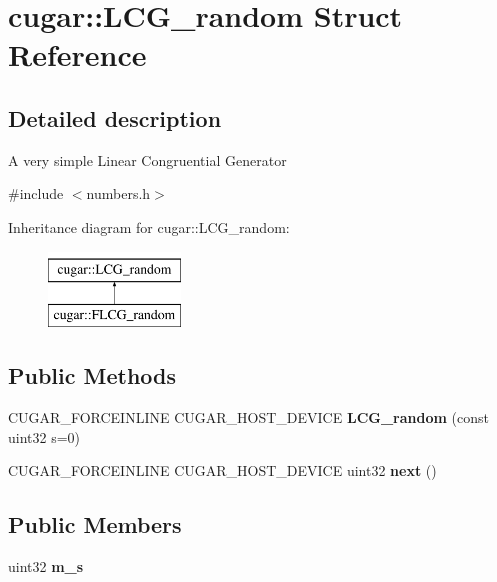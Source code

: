 \hypertarget{structcugar_1_1_l_c_g__random}{}\section{cugar\+:\+:L\+C\+G\+\_\+random Struct Reference}
\label{structcugar_1_1_l_c_g__random}


\subsection{Detailed description}
A very simple Linear Congruential Generator 

{\ttfamily \#include $<$numbers.\+h$>$}

Inheritance diagram for cugar\+:\+:L\+C\+G\+\_\+random\+:\begin{figure}[H]
\begin{center}
\leavevmode
\includegraphics[height=2.000000cm]{structcugar_1_1_l_c_g__random}
\end{center}
\end{figure}
\subsection*{Public Methods}
\begin{DoxyCompactItemize}
\item 
\mbox{\label{structcugar_1_1_l_c_g__random_a9e8beadc386fbf731a1124690563842d}} 
C\+U\+G\+A\+R\+\_\+\+F\+O\+R\+C\+E\+I\+N\+L\+I\+NE C\+U\+G\+A\+R\+\_\+\+H\+O\+S\+T\+\_\+\+D\+E\+V\+I\+CE {\bfseries L\+C\+G\+\_\+random} (const uint32 s=0)
\item 
\mbox{\label{structcugar_1_1_l_c_g__random_a50a0c4356d6e21e38e0374627944612e}} 
C\+U\+G\+A\+R\+\_\+\+F\+O\+R\+C\+E\+I\+N\+L\+I\+NE C\+U\+G\+A\+R\+\_\+\+H\+O\+S\+T\+\_\+\+D\+E\+V\+I\+CE uint32 {\bfseries next} ()
\end{DoxyCompactItemize}
\subsection*{Public Members}
\begin{DoxyCompactItemize}
\item 
\mbox{\label{structcugar_1_1_l_c_g__random_a42f6cd7352922a8ef1cd925b0c4c7be5}} 
uint32 {\bfseries m\+\_\+s}
\end{DoxyCompactItemize}
